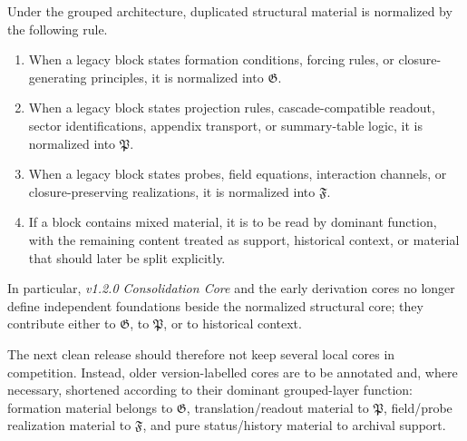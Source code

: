 \begin{proposition}
\label{prop:normalization-map-duplicated-core-material}
Under the grouped architecture, duplicated structural material is normalized by
the following rule.
\begin{enumerate}[leftmargin=2em,label=(\roman*)]
\item When a legacy block states formation conditions, forcing rules, or
closure-generating principles, it is normalized into $\mathfrak G$.
\item When a legacy block states projection rules, cascade-compatible readout,
sector identifications, appendix transport, or summary-table logic, it is
normalized into $\mathfrak P$.
\item When a legacy block states probes, field equations, interaction channels,
or closure-preserving realizations, it is normalized into $\mathfrak F$.
\item If a block contains mixed material, it is to be read by dominant function,
with the remaining content treated as support, historical context, or material
that should later be split explicitly.
\end{enumerate}
In particular, \emph{v1.2.0 Consolidation Core} and the early derivation cores no
longer define independent foundations beside the normalized structural core;
they contribute either to $\mathfrak G$, to $\mathfrak P$, or to historical
context.
\end{proposition}

\begin{remark}
\label{rem:practical-consequence-next-clean-release}
The next clean release should therefore not keep several local cores in
competition. Instead, older version-labelled cores are to be annotated and,
where necessary, shortened according to their dominant grouped-layer function:
formation material belongs to $\mathfrak G$, translation/readout material to
$\mathfrak P$, field/probe realization material to $\mathfrak F$, and pure
status/history material to archival support.
\end{remark}


